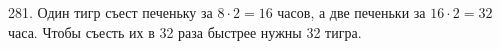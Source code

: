 281. Один тигр съест печеньку за $8\cdot2=16$ часов, а две печеньки за $16\cdot2=32$ часа. Чтобы съесть их в 32 раза быстрее нужны 32 тигра.\\
